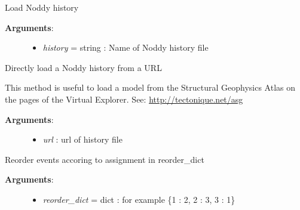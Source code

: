 \documentclass[a4paper,10pt,english]{sphinxmanual}
\begin{document}
\begin{fulllineitems}
\begin{fulllineitems}
\begin{description}
\begin{itemize}
\end{itemize}

\end{description}

\end{fulllineitems}


\begin{fulllineitems}
\label{pynoddy:pynoddy.history.NoddyHistory.load_history}
Load Noddy history
\begin{description}
\item[{\textbf{Arguments}:}] \leavevmode\begin{itemize}
\item {} 
\emph{history} = string : Name of Noddy history file

\end{itemize}

\end{description}

\end{fulllineitems}


\begin{fulllineitems}
\label{pynoddy:pynoddy.history.NoddyHistory.load_history_from_url}
Directly load a Noddy history from a URL

This method is useful to load a model from the Structural Geophysics
Atlas on the pages of the Virtual Explorer.
See: \href{http://tectonique.net/asg}{http://tectonique.net/asg}
\begin{description}
\item[{\textbf{Arguments}:}] \leavevmode\begin{itemize}
\item {} 
\emph{url} : url of history file

\end{itemize}

\end{description}

\end{fulllineitems}


\begin{fulllineitems}
\label{pynoddy:pynoddy.history.NoddyHistory.reorder_events}
Reorder events accoring to assignment in reorder\_dict
\begin{description}
\item[{\textbf{Arguments}:}] \leavevmode\begin{itemize}
\item {} 
\emph{reorder\_dict} = dict : for example \{1 : 2, 2 : 3, 3 : 1\}


\end{itemize}
\end{description}
\end{fulllineitems}
\end{fulllineitems}
\end{document}
